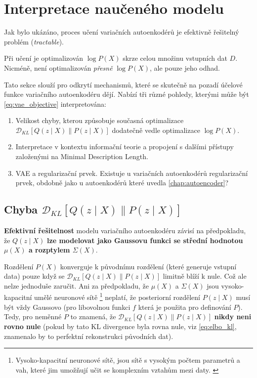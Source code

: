 \section{Interpretace naučeného modelu}
Jak bylo ukázáno, proces učení variačních autoenkodérů je efektivně řešitelný problém (\emph{tractable}).

Při učení je optimalizován $\log P(X)$ skrze celou množinu vstupních dat $D$. Nicméně, není optimalizován \emph{přesně} $\log P(X)$, ale pouze jeho odhad.

Tato sekce slouží pro odkrytí mechanismů, které se skutečně na pozadí účelové funkce variačního autoenkodéru dějí.
Nabízí tři různé pohledy, kterými může být \autoref{eq:vae_objective} interpretována:
\begin{enumerate}
    \item Velikost chyby, kterou způsobuje současná optimalizace $\mathcal{D}_{KL}\left[ Q(z\mid X) \parallel P(z\mid X) \right]$ dodatečně vedle optimalizace $\log P(X)$.
    \item Interpretace v kontextu informační teorie a propojení s dalšími přístupy založenými na Minimal Description Length.
    \item VAE a regularizační prvek. Existuje u variačních autoenkodérů regularizační prvek, obdobně jako u  autoenkodérů které uvedla \autoref{chap:autoencoder}?
\end{enumerate}

\subsection{Chyba $\mathcal{D}_{KL}\left[ Q(z\mid X) \parallel P(z\mid X) \right]$}
\textbf{Efektivní řešitelnost} modelu variačního autoenkodéru závisí na předpokladu,
že $Q(z\mid X)$ \textbf{lze modelovat jako Gaussovu funkci se střední hodnotou $\mu(X)$ a rozptylem $\Sigma(X)$}.

Rozdělení $P(X)$ konverguje k původnímu rozdělení (které generuje vstupní data) pouze když se $\mathcal{D}_{KL}\left[ Q(z\mid X) \parallel P(z\mid X) \right]$ limitně blíží k nule.
Což ale nelze jednoduše zaručit. Ani za předpokladu, že $\mu(X)$ a $\Sigma(X)$ jsou vysoko-kapacitní umělé neuronové sítě
\footnote{Vysoko-kapacitní neuronové sítě, jsou sítě s vysokým počtem parametrů a vah, které jim umožňují učit se komplexním vztahům mezi daty. \cite[Kapitola 5]{Goodfellow2016}}
neplatí, že posteriorní rozdělení $P(z\mid X)$ musí být vždy Gaussovo (pro libovolnou funkci $f$ která je použita pro definování $P$).
Tedy, pro neměnné $P$ to znamená, že $\mathcal{D}_{KL}\left[ Q(z\mid X) \parallel P(z\mid X) \right]$ \textbf{nikdy neni rovno nule} (pokud by tato KL divergence byla rovna nule, viz \autoref{eq:elbo_kl}, znamenalo by to perfektní rekonstrukci původních dat).

